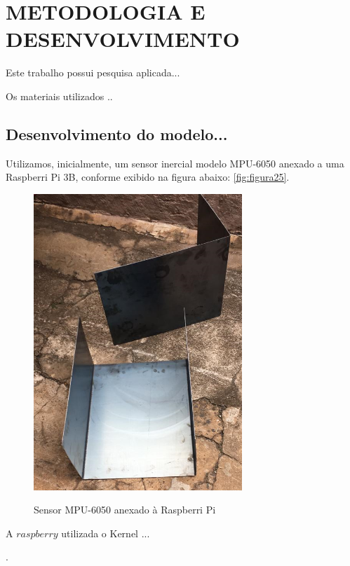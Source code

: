 \chapter{METODOLOGIA E DESENVOLVIMENTO}
\label{chap:metodologia}

Este trabalho possui pesquisa aplicada...
        
Os materiais utilizados ..

\section{Desenvolvimento do modelo...}

Utilizamos, inicialmente, um sensor inercial modelo MPU-6050 anexado a uma Raspberri Pi 3B, conforme exibido na figura abaixo: \ref{fig:figura25}.


\begin{figure}[H]
    \centering
    \caption{Sensor MPU-6050 anexado à Raspberri Pi}
    \includegraphics[width=0.7\textwidth]{figuras/figu22.png}
    \label{fig:figura22}
\end{figure}

A $raspberry$ utilizada o Kernel ...





























.













